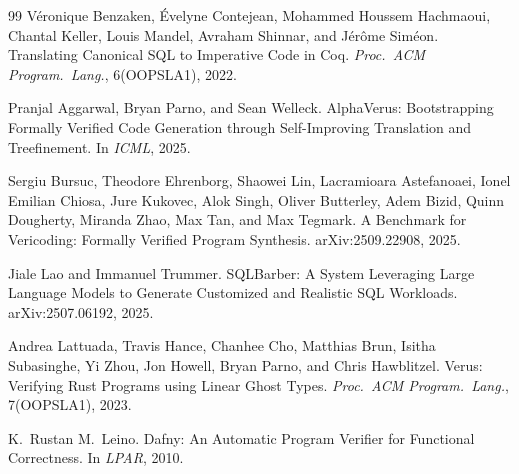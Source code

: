 \documentclass[sigconf, nonacm]{acmart}
\begin{document}
\begin{thebibliography}{99}
V{\'e}ronique Benzaken, {\'E}velyne Contejean, Mohammed Houssem Hachmaoui, Chantal Keller, Louis Mandel, Avraham Shinnar, and J{\'e}r{\^o}me Sim{\'e}on.
\newblock Translating Canonical SQL to Imperative Code in Coq.
\newblock \emph{Proc.\ ACM Program.\ Lang.}, 6(OOPSLA1), 2022.

Pranjal Aggarwal, Bryan Parno, and Sean Welleck.
\newblock AlphaVerus: Bootstrapping Formally Verified Code Generation through Self-Improving Translation and Treefinement.
\newblock In \emph{ICML}, 2025.

Sergiu Bursuc, Theodore Ehrenborg, Shaowei Lin, Lacramioara Astefanoaei, Ionel Emilian Chiosa, Jure Kukovec, Alok Singh, Oliver Butterley, Adem Bizid, Quinn Dougherty, Miranda Zhao, Max Tan, and Max Tegmark.
\newblock A Benchmark for Vericoding: Formally Verified Program Synthesis.
\newblock arXiv:2509.22908, 2025.

Jiale Lao and Immanuel Trummer.
\newblock SQLBarber: A System Leveraging Large Language Models to Generate Customized and Realistic SQL Workloads.
\newblock arXiv:2507.06192, 2025.

Andrea Lattuada, Travis Hance, Chanhee Cho, Matthias Brun, Isitha Subasinghe, Yi Zhou, Jon Howell, Bryan Parno, and Chris Hawblitzel.
\newblock Verus: Verifying Rust Programs using Linear Ghost Types.
\newblock \emph{Proc.\ ACM Program.\ Lang.}, 7(OOPSLA1), 2023.

K.\ Rustan M.\ Leino.
\newblock Dafny: An Automatic Program Verifier for Functional Correctness.
\newblock In \emph{LPAR}, 2010.



\end{thebibliography}
\end{document}
